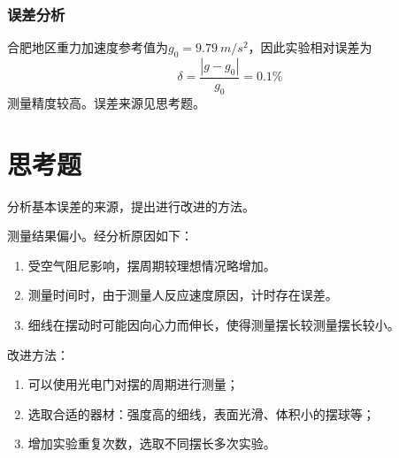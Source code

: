 \documentclass[12pt]{article}
\begin{document}
\subsubsection*{误差分析}

合肥地区重力加速度参考值为$g_0=\SI{9.79}{m/s^2}$，因此实验相对误差为
\[\delta =\frac{|g-g_0|}{g_0}=0.1\%\]
测量精度较高。误差来源见思考题。

\section*{思考题}
分析基本误差的来源，提出进行改进的方法。

测量结果偏小。经分析原因如下：

\begin{enumerate}
    \item 受空气阻尼影响，摆周期较理想情况略增加。
    \item 测量时间时，由于测量人反应速度原因，计时存在误差。
    \item 细线在摆动时可能因向心力而伸长，使得测量摆长较测量摆长较小。
\end{enumerate}

改进方法：
\begin{enumerate}
    \item 可以使用光电门对摆的周期进行测量；
    \item 选取合适的器材：强度高的细线，表面光滑、体积小的摆球等；
    \item 增加实验重复次数，选取不同摆长多次实验。
\end{enumerate}
\end{document}
